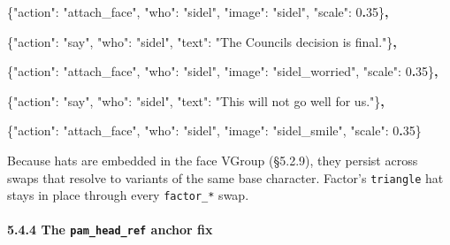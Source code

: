 \documentclass[
  11pt,
]{book}
\newenvironment{Shaded}{}{}
\newcommand{\DataTypeTok}[1]{\textcolor[rgb]{0.56,0.13,0.00}{#1}}
\newcommand{\DecValTok}[1]{\textcolor[rgb]{0.25,0.63,0.44}{#1}}
\newcommand{\ErrorTok}[1]{\textcolor[rgb]{1.00,0.00,0.00}{\textbf{#1}}}
\newcommand{\FunctionTok}[1]{\textcolor[rgb]{0.02,0.16,0.49}{#1}}
\newcommand{\StringTok}[1]{\textcolor[rgb]{0.25,0.44,0.63}{#1}}
\begin{document}
\begin{Shaded}
\begin{Highlighting}[]
\FunctionTok{\{}\DataTypeTok{"action"}\FunctionTok{:} \StringTok{"attach\_face"}\FunctionTok{,} \DataTypeTok{"who"}\FunctionTok{:} \StringTok{"sidel"}\FunctionTok{,}
 \DataTypeTok{"image"}\FunctionTok{:} \StringTok{"sidel"}\FunctionTok{,} \DataTypeTok{"scale"}\FunctionTok{:} \DecValTok{0}\ErrorTok{.}\DecValTok{35}\FunctionTok{\}}\ErrorTok{,}

\FunctionTok{\{}\DataTypeTok{"action"}\FunctionTok{:} \StringTok{"say"}\FunctionTok{,} \DataTypeTok{"who"}\FunctionTok{:} \StringTok{"sidel"}\FunctionTok{,}
 \DataTypeTok{"text"}\FunctionTok{:} \StringTok{"The Council\textquotesingle{}s decision is final."}\FunctionTok{\}}\ErrorTok{,}

\FunctionTok{\{}\DataTypeTok{"action"}\FunctionTok{:} \StringTok{"attach\_face"}\FunctionTok{,} \DataTypeTok{"who"}\FunctionTok{:} \StringTok{"sidel"}\FunctionTok{,}
 \DataTypeTok{"image"}\FunctionTok{:} \StringTok{"sidel\_worried"}\FunctionTok{,} \DataTypeTok{"scale"}\FunctionTok{:} \DecValTok{0}\ErrorTok{.}\DecValTok{35}\FunctionTok{\}}\ErrorTok{,}

\FunctionTok{\{}\DataTypeTok{"action"}\FunctionTok{:} \StringTok{"say"}\FunctionTok{,} \DataTypeTok{"who"}\FunctionTok{:} \StringTok{"sidel"}\FunctionTok{,}
 \DataTypeTok{"text"}\FunctionTok{:} \StringTok{"This will not go well for us."}\FunctionTok{\}}\ErrorTok{,}

\FunctionTok{\{}\DataTypeTok{"action"}\FunctionTok{:} \StringTok{"attach\_face"}\FunctionTok{,} \DataTypeTok{"who"}\FunctionTok{:} \StringTok{"sidel"}\FunctionTok{,}
 \DataTypeTok{"image"}\FunctionTok{:} \StringTok{"sidel\_smile"}\FunctionTok{,} \DataTypeTok{"scale"}\FunctionTok{:} \DecValTok{0}\ErrorTok{.}\DecValTok{35}\FunctionTok{\}}
\end{Highlighting}
\end{Shaded}

Because hats are embedded in the face VGroup (§5.2.9), they persist
across swaps that resolve to variants of the same base character.
Factor's \texttt{triangle} hat stays in place through every
\texttt{factor\_*} swap.

\paragraph{\texorpdfstring{5.4.4 The \texttt{pam\_head\_ref} anchor
fix}{5.4.4 The pam\_head\_ref anchor fix}}\label{the-pam_head_ref-anchor-fix}
\end{document}
